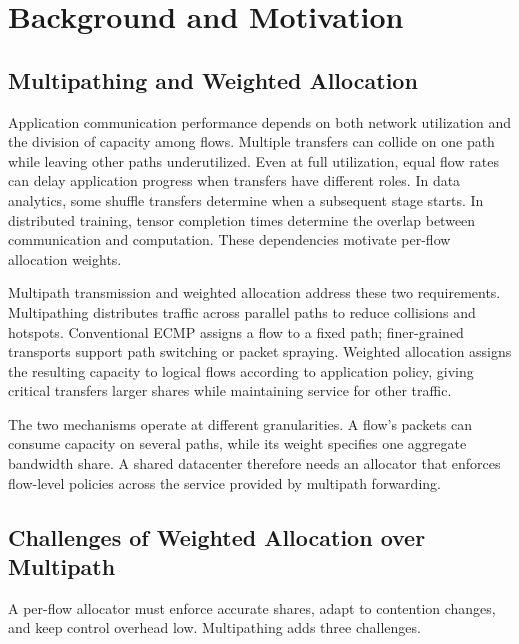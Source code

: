\section{Background and Motivation}
\label{sec:background}

\subsection{Multipathing and Weighted Allocation}

Application communication performance depends on both network utilization and the division of capacity among flows. Multiple transfers can collide on one path while leaving other paths underutilized. Even at full utilization, equal flow rates can delay application progress when transfers have different roles. In data analytics, some shuffle transfers determine when a subsequent stage starts. In distributed training, tensor completion times determine the overlap between communication and computation. These dependencies motivate per-flow allocation weights.

Multipath transmission and weighted allocation address these two requirements. Multipathing distributes traffic across parallel paths to reduce collisions and hotspots. Conventional ECMP assigns a flow to a fixed path; finer-grained transports support path switching or packet spraying. Weighted allocation assigns the resulting capacity to logical flows according to application policy, giving critical transfers larger shares while maintaining service for other traffic.

The two mechanisms operate at different granularities. A flow's packets can consume capacity on several paths, while its weight specifies one aggregate bandwidth share. A shared datacenter therefore needs an allocator that enforces flow-level policies across the service provided by multipath forwarding.

\subsection{Challenges of Weighted Allocation over Multipath}

A per-flow allocator must enforce accurate shares, adapt to contention changes, and keep control overhead low. Multipathing adds three challenges.

